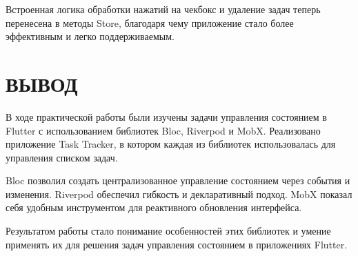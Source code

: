 Встроенная логика обработки нажатий на чекбокс
и удаление задач теперь перенесена в методы Store,
благодаря чему приложение стало более эффективным и легко поддерживаемым.

\clearpage

\section*{ВЫВОД}

В ходе практической работы были изучены
задачи управления состоянием в Flutter
с использованием библиотек Bloc, Riverpod и MobX.
Реализовано приложение Task Tracker,
в котором каждая из библиотек использовалась
для управления списком задач.

Bloc позволил создать централизованное управление состоянием
через события и изменения.
Riverpod обеспечил гибкость и декларативный подход.
MobX показал себя удобным инструментом
для реактивного обновления интерфейса.

Результатом работы стало понимание особенностей этих библиотек
и умение применять их для решения задач управления состоянием
в приложениях Flutter.

